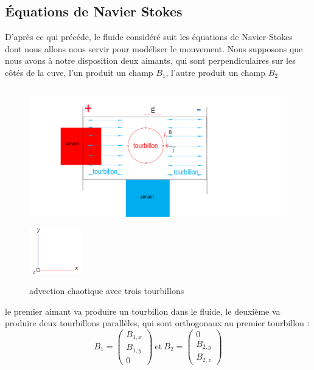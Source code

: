 \documentclass[a4paper,12pt,titlepage]{report}
\begin{document}
\begin{onehalfspace}
\chapter{Équations de  Navier Stokes} 
D'après ce qui précéde, le fluide considéré suit les équations de Navier-Stokes dont nous allons nous servir pour modéliser le mouvement.
Nous supposons que nous avons à notre disposition deux aimants, qui sont perpendiculaires sur les côtés de la cuve, l'un produit un champ $B_1$, l'autre produit un champ $B_2$
\begin{figure}[!h]
\begin{center}
\centering
\includegraphics[height = 6cm, keepaspectratio]{graphes/cuveaimant4.png} 
\includegraphics[height = 2cm, keepaspectratio]{graphes/axes.png}
\caption{advection chaotique avec trois tourbillons}
\end{center}
\end{figure}
\newpage
le premier aimant va produire un tourbillon dans le fluide, le deuxième va produire deux tourbillons parallèles, qui sont orthogonaux au premier tourbillon  : 
\[
	B_1 = 
	\begin{pmatrix}
   		B_{1,x}\\
  		 B _{1,y}\\
  		 0
	\end{pmatrix} \
	\text{et} \
	B_2 = \begin{pmatrix}
  			 0\\
   			B _{2,y}\\
   			B_{2,z}
			\end{pmatrix}
\]
\\


\end{onehalfspace}
\end{document}
